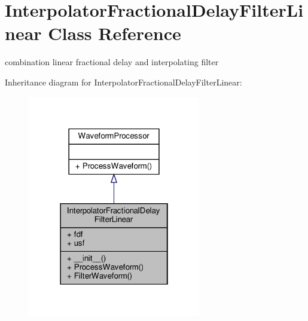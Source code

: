 \hypertarget{classSignalIntegrity_1_1TimeDomain_1_1Filters_1_1InterpolatorLinear_1_1InterpolatorFractionalDelayFilterLinear}{}\section{Interpolator\+Fractional\+Delay\+Filter\+Linear Class Reference}
\label{classSignalIntegrity_1_1TimeDomain_1_1Filters_1_1InterpolatorLinear_1_1InterpolatorFractionalDelayFilterLinear}


combination linear fractional delay and interpolating filter  




Inheritance diagram for Interpolator\+Fractional\+Delay\+Filter\+Linear\+:
\nopagebreak
\begin{figure}[H]
\begin{center}
\leavevmode
\includegraphics[width=214pt]{classSignalIntegrity_1_1TimeDomain_1_1Filters_1_1InterpolatorLinear_1_1InterpolatorFractionalDelayFilterLinear__inherit__graph}
\end{center}
\end{figure}


